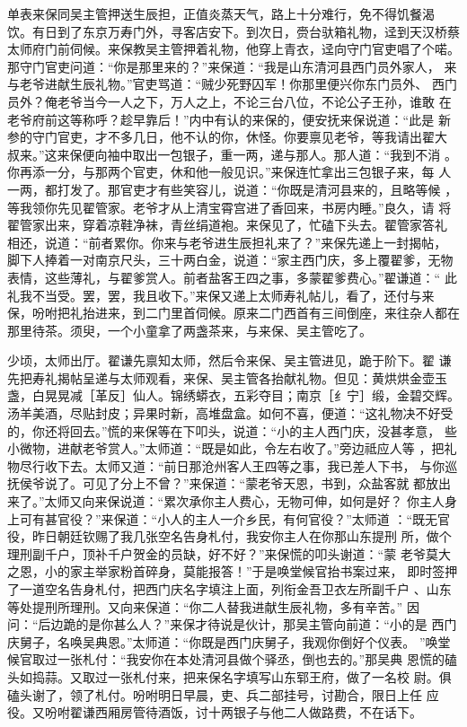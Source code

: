 单表来保同吴主管押送生辰担，正值炎蒸天气，路上十分难行，免不得饥餐渴
饮。有日到了东京万寿门外，寻客店安下。到次日，赍台驮箱礼物，迳到天汉桥蔡
太师府门前伺候。来保教吴主管押着礼物，他穿上青衣，迳向守门官吏唱了个喏。
那守门官吏问道：“你是那里来的？”来保道：“我是山东清河县西门员外家人，
来与老爷进献生辰礼物。”官吏骂道：“贼少死野囚军！你那里便兴你东门员外、
西门员外？俺老爷当今一人之下，万人之上，不论三台八位，不论公子王孙，谁敢
在老爷府前这等称呼？趁早靠后！”内中有认的来保的，便安抚来保说道：“此是
新参的守门官吏，才不多几日，他不认的你，休怪。你要禀见老爷，等我请出翟大
叔来。”这来保便向袖中取出一包银子，重一两，递与那人。那人道：“我到不消
。你再添一分，与那两个官吏，休和他一般见识。”来保连忙拿出三包银子来，每
人一两，都打发了。那官吏才有些笑容儿，说道：“你既是清河县来的，且略等候
，等我领你先见翟管家。老爷才从上清宝霄宫进了香回来，书房内睡。”良久，请
将翟管家出来，穿着凉鞋净袜，青丝绢道袍。来保见了，忙磕下头去。翟管家答礼
相还，说道：“前者累你。你来与老爷进生辰担礼来了？”来保先递上一封揭帖，
脚下人捧着一对南京尺头，三十两白金，说道：“家主西门庆，多上覆翟爹，无物
表情，这些薄礼，与翟爹赏人。前者盐客王四之事，多蒙翟爹费心。”翟谦道：“
此礼我不当受。罢，罢，我且收下。”来保又递上太师寿礼帖儿，看了，还付与来
保，吩咐把礼抬进来，到二门里首伺候。原来二门西首有三间倒座，来往杂人都在
那里待茶。须臾，一个小童拿了两盏茶来，与来保、吴主管吃了。

少顷，太师出厅。翟谦先禀知太师，然后令来保、吴主管进见，跪于阶下。翟
谦先把寿礼揭帖呈递与太师观看，来保、吴主管各抬献礼物。但见：黄烘烘金壶玉
盏，白晃晃减［革反］仙人。锦绣蟒衣，五彩夺目；南京［纟宁］缎，金碧交辉。
汤羊美酒，尽贴封皮；异果时新，高堆盘盒。如何不喜，便道：“这礼物决不好受
的，你还将回去。”慌的来保等在下叩头，说道：“小的主人西门庆，没甚孝意，
些小微物，进献老爷赏人。”太师道：“既是如此，令左右收了。”旁边祗应人等
，把礼物尽行收下去。太师又道：“前日那沧州客人王四等之事，我已差人下书，
与你巡抚侯爷说了。可见了分上不曾？”来保道：“蒙老爷天恩，书到，众盐客就
都放出来了。”太师又向来保说道：“累次承你主人费心，无物可伸，如何是好？
你主人身上可有甚官役？”来保道：“小人的主人一介乡民，有何官役？”太师道
：“既无官役，昨日朝廷钦赐了我几张空名告身札付，我安你主人在你那山东提刑
所，做个理刑副千户，顶补千户贺金的员缺，好不好？”来保慌的叩头谢道：“蒙
老爷莫大之恩，小的家主举家粉首碎身，莫能报答！”于是唤堂候官抬书案过来，
即时签押了一道空名告身札付，把西门庆名字填注上面，列衔金吾卫衣左所副千户
、山东等处提刑所理刑。又向来保道：“你二人替我进献生辰礼物，多有辛苦。”
因问：“后边跪的是你甚么人？”来保才待说是伙计，那吴主管向前道：“小的是
西门庆舅子，名唤吴典恩。”太师道：“你既是西门庆舅子，我观你倒好个仪表。
”唤堂候官取过一张札付：“我安你在本处清河县做个驿丞，倒也去的。”那吴典
恩慌的磕头如捣蒜。又取过一张札付来，把来保名字填写山东郓王府，做了一名校
尉。俱磕头谢了，领了札付。吩咐明日早晨，吏、兵二部挂号，讨勘合，限日上任
应役。又吩咐翟谦西厢房管待酒饭，讨十两银子与他二人做路费，不在话下。

